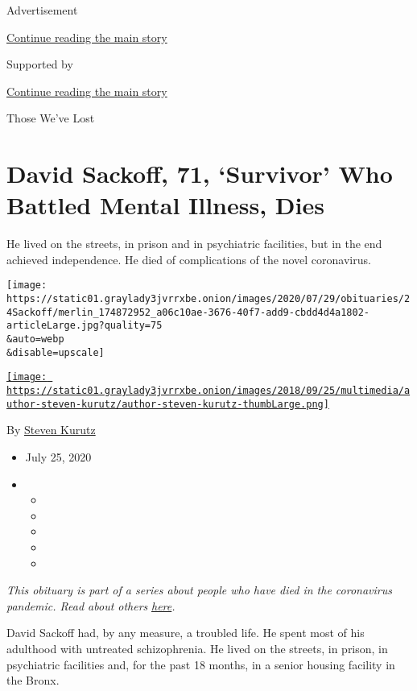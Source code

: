 Advertisement

\protect\hyperlink{after-top}{Continue reading the main story}

Supported by

\protect\hyperlink{after-sponsor}{Continue reading the main story}

Those We've Lost

\hypertarget{david-sackoff-71-survivor-who-battled-mental-illness-dies}{%
\section{David Sackoff, 71, `Survivor' Who Battled Mental Illness,
Dies}\label{david-sackoff-71-survivor-who-battled-mental-illness-dies}}

He lived on the streets, in prison and in psychiatric facilities, but in
the end achieved independence. He died of complications of the novel
coronavirus.

\texttt{[image: https://static01.graylady3jvrrxbe.onion/images/2020/07/29/obituaries/24Sackoff/merlin\_174872952\_a06c10ae-3676-40f7-add9-cbdd4d4a1802-articleLarge.jpg?quality=75\\\&auto=webp\\\&disable=upscale]}

\href{https://www.nytimes3xbfgragh.onion/by/steven-kurutz}{\texttt{[image: https://static01.graylady3jvrrxbe.onion/images/2018/09/25/multimedia/author-steven-kurutz/author-steven-kurutz-thumbLarge.png]}}

By \href{https://www.nytimes3xbfgragh.onion/by/steven-kurutz}{Steven
Kurutz}

\begin{itemize}
\item
  July 25, 2020
\item
  \begin{itemize}
  \item
  \item
  \item
  \item
  \item
  \end{itemize}
\end{itemize}

\emph{This obituary is part of a series about people who have died in
the coronavirus pandemic. Read about others}
\href{https://www.nytimes3xbfgragh.onion/interactive/2020/obituaries/people-died-coronavirus-obituaries.html}{\emph{here}}\emph{.}

David Sackoff had, by any measure, a troubled life. He spent most of his
adulthood with untreated schizophrenia. He lived on the streets, in
prison, in psychiatric facilities and, for the past 18 months, in a
senior housing facility in the Bronx.

